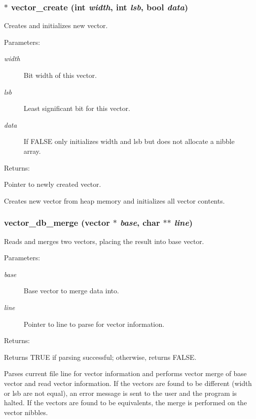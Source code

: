 \subsubsection{$\ast$ vector\_\-create (int {\em width}, int {\em lsb}, {\bf bool} {\em data})}\label{vector_8c_a9}


Creates and initializes new vector.

\begin{Desc}
\item[Parameters: ]\par
\begin{description}
\item[{\em 
width}]Bit width of this vector. \item[{\em 
lsb}]Least significant bit for this vector. \item[{\em 
data}]If FALSE only initializes width and lsb but does not allocate a nibble array.\end{description}
\end{Desc}
\begin{Desc}
\item[Returns: ]\par
Pointer to newly created vector.\end{Desc}
Creates new vector from heap memory and initializes all vector contents. 
\subsubsection{ vector\_\-db\_\-merge ({\bf vector} $\ast$ {\em base}, char $\ast$$\ast$ {\em line})}\label{vector_8c_a12}


Reads and merges two vectors, placing the result into base vector.

\begin{Desc}
\item[Parameters: ]\par
\begin{description}
\item[{\em 
base}]Base vector to merge data into. \item[{\em 
line}]Pointer to line to parse for vector information.\end{description}
\end{Desc}
\begin{Desc}
\item[Returns: ]\par
Returns TRUE if parsing successful; otherwise, returns FALSE.\end{Desc}
Parses current file line for vector information and performs vector merge of  base vector and read vector information. If the vectors are found to be different (width or lsb are not equal), an error message is sent to the user and the program is halted. If the vectors are found to be equivalents, the merge is performed on the vector nibbles. 
